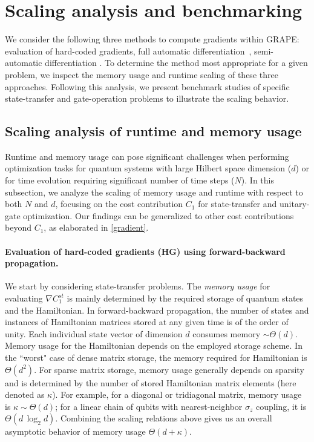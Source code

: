 \section{Scaling analysis and benchmarking}
\label{Scaling analysis and benchmarking}
We consider the following three methods to compute gradients within GRAPE: evaluation of hard-coded gradients, full automatic differentiation\ \cite{pacleung2017speedup}, semi-automatic differentiation \cite{semiadgoerz2022quantum}. To determine the method most appropriate for a given problem, we inspect the memory usage and runtime scaling of these three approaches. Following this analysis, we present benchmark studies of specific state-transfer and gate-operation problems to illustrate the scaling behavior.
\subsection{Scaling analysis of runtime and memory usage}
\label{scaling analysis}
Runtime and memory usage can pose significant challenges when performing optimization tasks for quantum systems with large Hilbert space dimension ($d$) or for time evolution requiring significant number of time steps ($N$). In this subsection, we analyze the scaling of memory usage and runtime with respect to both $N$ and $d$, focusing on the cost contribution $C_1$ for state-transfer and unitary-gate optimization. Our findings can be generalized to other cost contributions beyond $C_1$, as elaborated in \ref{gradient}.


\paragraph{Evaluation of hard-coded gradients (HG) using forward-backward propagation.}
\label{AGscaling}

We start by considering state-transfer problems. The \textit{memory usage} for evaluating $\nabla C_1^{st}$ is mainly determined by the required storage of quantum states and the Hamiltonian. In forward-backward propagation, the number of states and instances of Hamiltonian matrices stored at any given time is of the order of unity. Each individual state vector of dimension $d$ consumes memory $\sim\Theta(d)$. Memory usage for the Hamiltonian depends on the employed storage scheme. In the ``worst" case of dense matrix storage, the memory required for Hamiltonian is $\Theta(d^2)$. For sparse matrix storage, memory usage generally depends on sparsity and is determined by the number of stored Hamiltonian matrix elements (here denoted as $\kappa$). For example, for a diagonal or tridiagonal matrix, memory usage is $\kappa\sim\Theta(d)$; for a linear chain of qubits with nearest-neighbor $\sigma_z$ coupling, it is $\Theta(d\, \log_2 d)$. Combining the scaling relations above gives us an overall asymptotic behavior of memory usage $\Theta(d+\kappa)$.

